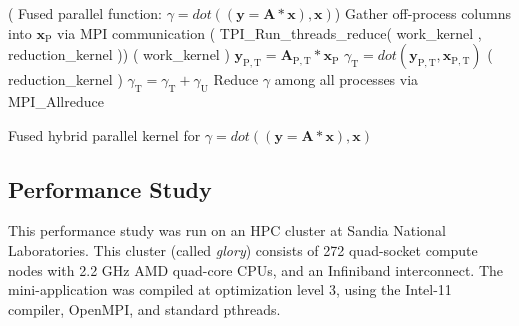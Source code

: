 \begin{algorithm}[h]
\SetAlgoLined
\DontPrintSemicolon
\Begin( Fused parallel function: \mbox{$\gamma = dot( ( \mathbf{y} = \mathbf{A} * \mathbf{x} ) , \mathbf{x} )$}){
\BlankLine
Gather off-process columns into $\mathbf{x}_\mathrm{P}$ via MPI communication \;
\BlankLine
\Call( \textnormal{TPI\_Run\_threads\_reduce( work\_kernel , reduction\_kernel )}){
\BlankLine
\CallThread( \textnormal{work\_kernel} ){
\BlankLine
$\mathbf{y}_\mathrm{P,T} = \mathbf{A}_\mathrm{P,T} * \mathbf{x}_\mathrm{P}$ \;
$\gamma_\mathrm{T} = dot( \mathbf{y}_\mathrm{P,T} , \mathbf{x}_\mathrm{P,T} )$ \;
}
\CallThread( \textnormal{reduction\_kernel} ){
\BlankLine
$\gamma_\mathrm{T} = \gamma_\mathrm{T} + \gamma_\mathrm{U}$ \;
}
}
Reduce $\gamma$ among all processes  via MPI\_Allreduce
}
\caption{Fused hybrid parallel kernel for \mbox{$\gamma = dot( ( \mathbf{y} = \mathbf{A} * \mathbf{x} ) , \mathbf{x} )$} }
\label{alg:FusedMXV}
\end{algorithm}

\clearpage

\subsection{Performance Study}

This performance study was run on an HPC cluster at Sandia National Laboratories.
%
This cluster (called \emph{glory}) consists of 272 quad-socket compute nodes with 2.2 GHz AMD quad-core CPUs, and an Infiniband interconnect.
%
The mini-application was compiled at optimization level 3, using the Intel-11 compiler, OpenMPI, and standard pthreads.


